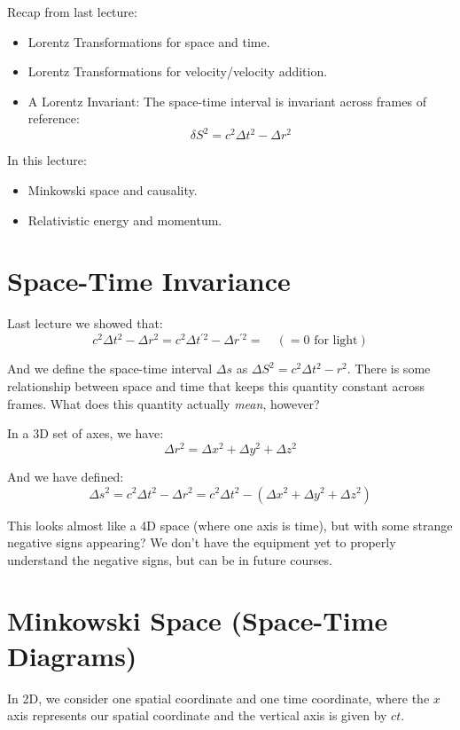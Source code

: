 
Recap from last lecture:
\begin{itemize}
    \item Lorentz Transformations for space and time.
    \item Lorentz Transformations for velocity/velocity addition.
    \item A Lorentz Invariant:
    The space-time interval is invariant across frames of reference:
    \[
        \delta S^2 = c^2 \Delta t^2 - \Delta r^2
    \]
\end{itemize}

In this lecture:
\begin{itemize}
    \item Minkowski space and causality.
    \item Relativistic energy and momentum.
\end{itemize}

\section{Space-Time Invariance}
Last lecture we showed that:
\[
    c^2 \Delta t^2 - \Delta r^2 = c^2 \Delta t^{\prime 2} - \Delta r^{\prime 2} = \quad (= 0 \text{ for light})
\]

And we define the space-time interval $\Delta s$ as $\Delta S^2 = c^2 \Delta t^2 - r^2$. There is some relationship between space and time that keeps this quantity constant across frames. What does this quantity actually \emph{mean}, however?

In a 3D set of axes, we have:
\[
    \Delta r^2 = \Delta x^2 + \Delta y^2 + \Delta z^2
\]

And we have defined:
\[
    \Delta s^2 = c^2 \Delta t^2 - \Delta r^2 = c^2 \Delta t^2 - \left(\Delta x^2 + \Delta y^2 + \Delta z^2\right)
\]

This looks almost like a 4D space (where one axis is time), but with some strange negative signs appearing? We don't have the equipment yet to properly understand the negative signs, but can be in future courses.

\section{Minkowski Space (Space-Time Diagrams)}
In 2D, we consider one spatial coordinate and one time coordinate, where the $x$ axis represents our spatial coordinate and the vertical axis is given by $ct$.

